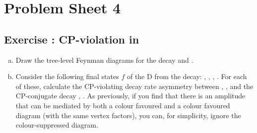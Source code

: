 \section*{Problem Sheet 4}
\label{sec:ps4}
\setcounter{psFourQuestions4}{0}
\renewcommand{\NewQuestion}[1]{\subsection*{Exercise : #1}}

\NewQuestion{CP-violation in }
\begin{enumerate}[a)]
\item Draw the tree-level Feynman diagrams for the decay  and .
\item Consider the following final states $f$ of the D from the
   decay: \prt{\pim \pip}, \prt{\Km \Kp},
  \prt{\Kp \pim}, \prt{\Km \pip}.  For each of these, calculate the
  CP-violating decay rate asymmetry between ,
  , and the CP-conjugate decay , . As previously, if you
  find that there is an amplitude that can be mediated by both a
  colour favoured and a colour favoured diagram (with the same vertex
  factors), you can, for simplicity, ignore the colour-suppressed
  diagram.
\end{enumerate}
